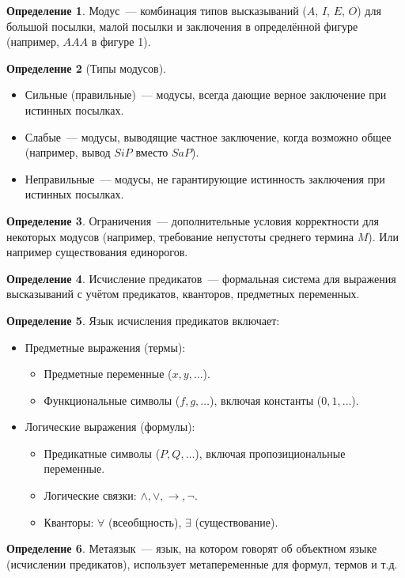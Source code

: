 \documentclass[a4paper,11pt]{article}
\theoremstyle{definition}
\newtheorem*{dfn}{Определение}
\begin{document}
\begin{dfn}
Модус~--- комбинация типов высказываний ($A$, $I$, $E$, $O$) для большой
посылки, малой посылки и заключения в определённой фигуре (например, $AAA$ в
фигуре 1).
\end{dfn}
\begin{dfn}[Типы модусов]
\begin{itemize}
\item Сильные (правильные)~--- модусы, всегда дающие верное заключение при
  истинных посылках.
\item Слабые~--- модусы, выводящие частное заключение, когда возможно общее
  (например, вывод $SiP$ вместо $SaP$).
\item Неправильные~--- модусы, не гарантирующие истинность заключения при
  истинных посылках.
\end{itemize}
\end{dfn}
\begin{dfn}
Ограничения~--- дополнительные условия корректности для некоторых модусов
(например, требование непустоты среднего термина $M$). Или например
существования единорогов.
\end{dfn}
\begin{dfn}
Исчисление предикатов~--- формальная система для выражения высказываний с учётом
предикатов, кванторов, предметных переменных.
\end{dfn}
\begin{dfn}
Язык исчисления предикатов включает:
\begin{itemize}
\item Предметные выражения (термы):
  \begin{itemize}
  \item Предметные переменные ($x, y, \dots$).
  \item Функциональные символы ($f, g, \dots$), включая константы ($0, 1,
    \dots$).
  \end{itemize}
\item Логические выражения (формулы):
  \begin{itemize}
  \item Предикатные символы ($P, Q, \dots$), включая пропозициональные
    переменные.
  \item Логические связки: $\wedge, \vee, \to, \neg$.
  \item Кванторы: $\forall$ (всеобщность), $\exists$ (существование).
  \end{itemize}
\end{itemize}
\end{dfn}
\begin{dfn}
Метаязык~--- язык, на котором говорят об объектном языке (исчислении
предикатов), использует метапеременные для формул, термов и т.д.
\end{dfn}
\end{document}

